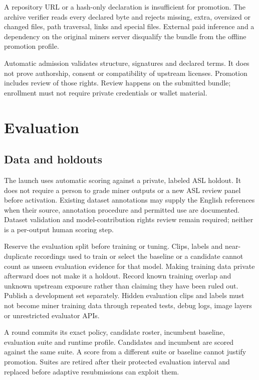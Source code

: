 A repository URL or a hash-only declaration is insufficient for promotion.
The archive verifier reads every declared byte and rejects missing, extra,
oversized or changed files, path traversal, links and special files.
External paid inference and a dependency on the original miner\textquotesingle s server
disqualify the bundle from the offline promotion profile.

Automatic admission validates structure, signatures and declared terms.
It does not prove authorship, consent or compatibility of upstream licenses.
Promotion includes review of those rights. Review happens on the submitted
bundle; enrollment must not require private credentials or wallet material.

\section{Evaluation}\label{4-evaluation}

\subsection{Data and holdouts}\label{41-data-and-holdouts}

The launch uses automatic scoring against a private, labeled ASL holdout. It
does not require a person to grade miner outputs or a new ASL review panel before
activation. Existing dataset annotations may supply the English references when
their source, annotation procedure and permitted use are documented. Dataset
validation and model-contribution rights review remain required; neither is a
per-output human scoring step.

Reserve the evaluation split before training or tuning. Clips, labels and
near-duplicate recordings used to train or select the baseline or a candidate
cannot count as unseen evaluation evidence for that model. Making training data
private afterward does not make it a holdout. Record known training overlap and
unknown upstream exposure rather than claiming they have been ruled out.
Publish a development set separately. Hidden evaluation clips and labels must
not become miner training data through repeated tests, debug logs, image layers
or unrestricted evaluator APIs.

A round commits its exact policy, candidate roster, incumbent baseline,
evaluation suite and runtime profile. Candidates and incumbent are scored
against the same suite. A score from a different suite or baseline cannot
justify promotion. Suites are retired after their protected evaluation
interval and replaced before adaptive resubmissions can exploit them.

